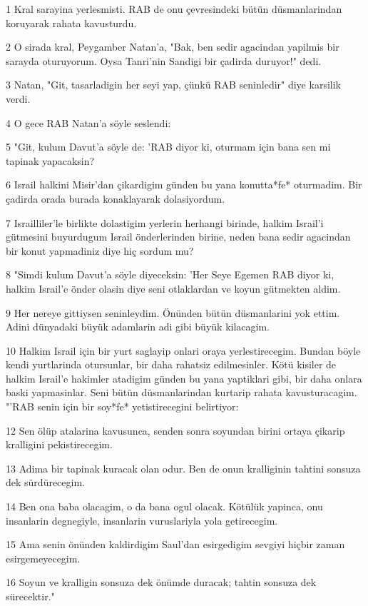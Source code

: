 \par 1 Kral sarayina yerlesmisti. RAB de onu çevresindeki bütün düsmanlarindan koruyarak rahata kavusturdu.
\par 2 O sirada kral, Peygamber Natan'a, "Bak, ben sedir agacindan yapilmis bir sarayda oturuyorum. Oysa Tanri'nin Sandigi bir çadirda duruyor!" dedi.
\par 3 Natan, "Git, tasarladigin her seyi yap, çünkü RAB seninledir" diye karsilik verdi.
\par 4 O gece RAB Natan'a söyle seslendi:
\par 5 "Git, kulum Davut'a söyle de: 'RAB diyor ki, oturmam için bana sen mi tapinak yapacaksin?
\par 6 Israil halkini Misir'dan çikardigim günden bu yana konutta*fe* oturmadim. Bir çadirda orada burada konaklayarak dolasiyordum.
\par 7 Israilliler'le birlikte dolastigim yerlerin herhangi birinde, halkim Israil'i gütmesini buyurdugum Israil önderlerinden birine, neden bana sedir agacindan bir konut yapmadiniz diye hiç sordum mu?
\par 8 "Simdi kulum Davut'a söyle diyeceksin: 'Her Seye Egemen RAB diyor ki, halkim Israil'e önder olasin diye seni otlaklardan ve koyun gütmekten aldim.
\par 9 Her nereye gittiysen seninleydim. Önünden bütün düsmanlarini yok ettim. Adini dünyadaki büyük adamlarin adi gibi büyük kilacagim.
\par 10 Halkim Israil için bir yurt saglayip onlari oraya yerlestirecegim. Bundan böyle kendi yurtlarinda otursunlar, bir daha rahatsiz edilmesinler. Kötü kisiler de halkim Israil'e hakimler atadigim günden bu yana yaptiklari gibi, bir daha onlara baski yapmasinlar. Seni bütün düsmanlarindan kurtarip rahata kavusturacagim. "'RAB senin için bir soy*fe* yetistirecegini belirtiyor:
\par 12 Sen ölüp atalarina kavusunca, senden sonra soyundan birini ortaya çikarip kralligini pekistirecegim.
\par 13 Adima bir tapinak kuracak olan odur. Ben de onun kralliginin tahtini sonsuza dek sürdürecegim.
\par 14 Ben ona baba olacagim, o da bana ogul olacak. Kötülük yapinca, onu insanlarin degnegiyle, insanlarin vuruslariyla yola getirecegim.
\par 15 Ama senin önünden kaldirdigim Saul'dan esirgedigim sevgiyi hiçbir zaman esirgemeyecegim.
\par 16 Soyun ve kralligin sonsuza dek önümde duracak; tahtin sonsuza dek sürecektir."
